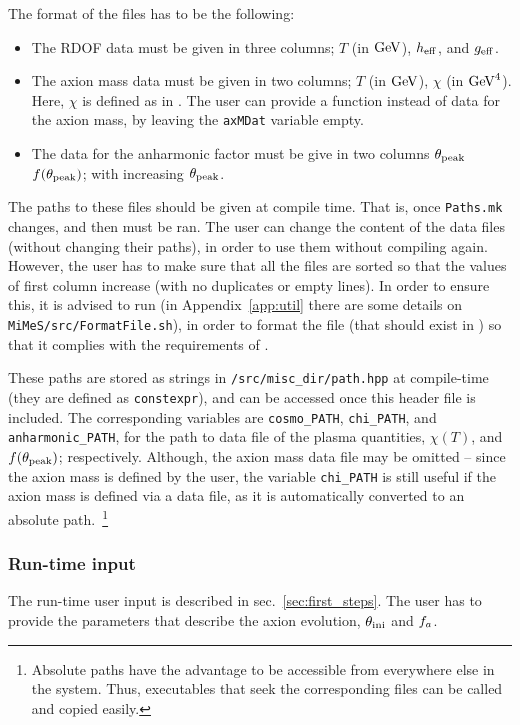\documentclass[11pt,a4paper]{article}
\begin{document}
The format of the files has to be the following:
%
\begin{itemize}
	\item The RDOF data must be given in three columns; $T$ (in ${\rm GeV}$), $h_{\rm eff}{}$, and $g_{\rm eff}{}$.
	\item The axion mass data must be given in two columns; $T$ (in ${\rm GeV}$), $\chi$ (in ${\rm GeV}^4$). Here, $\chi$ is defined as in . 
	The user can provide a function instead of data for the axion mass, by leaving the  {\tt axMDat} variable empty. 
	\item The data for the anharmonic factor must be give in two columns   $\theta_{\rm peak}{}$ $f(\theta_{\rm peak}{})$; with increasing $\theta_{\rm peak}{}$.
\end{itemize}
%
The paths to these files should be given at compile time. That is, once {\tt Paths.mk} changes,  and then  must be ran. The user can change the content of the data files (without changing their paths), in order to use them without compiling \mimes again. However, the user has to make sure that all the files are sorted so that the values of first column increase (with no duplicates or empty lines). In order to ensure this, it is advised to run  (in Appendix~\ref{app:util} there are some details on {\tt MiMeS/src/FormatFile.sh}), in order to format the file (that should exist in ) so that it complies with the requirements of \mimes.

These paths are stored as strings in {\tt \mimes/src/misc\_dir/path.hpp} at compile-time (they are defined as {\tt constexpr}), and can be accessed once this header file is included. The corresponding variables are {\tt cosmo\_PATH}, {\tt chi\_PATH}, and {\tt anharmonic\_PATH}, for the path to data file of the plasma quantities, $\chi(T)$, and $f(\theta_{\rm peak}{})$; respectively. Although, the axion mass data file may be omitted -- since the axion mass is defined by the user, the variable {\tt chi\_PATH} is still useful if the axion mass is defined via a data file, as it is automatically converted to an absolute path.~\footnote{Absolute paths have the advantage to be accessible from everywhere else in the system. Thus, executables that seek the corresponding files can be called and copied easily.}




\subsubsection{Run-time input}\label{sec:run_time_input}
%
The run-time user input is described in sec.~\ref{sec:first_steps}. The user has to provide the parameters that describe the axion evolution, $\theta_{\rm ini}{}$ and $f_{a}{}$. 
\end{document}
